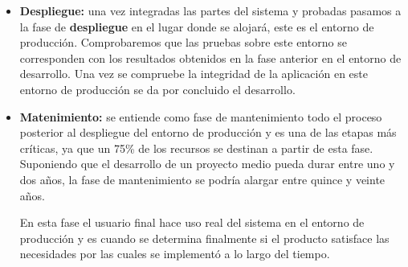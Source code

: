 \begin{itemize}
\item \textbf{Despliegue: } una vez integradas las partes del sistema y probadas pasamos a la fase de \textbf{despliegue} en el lugar donde se alojará, este es el entorno de producción. Comprobaremos que las pruebas sobre este entorno se corresponden con los resultados obtenidos en la fase anterior en el entorno de desarrollo. Una vez se compruebe la integridad de la aplicación en este entorno de producción se da por concluido el desarrollo.
\item \textbf{Matenimiento: } se entiende como fase de mantenimiento todo el proceso posterior al despliegue del entorno de producción y es una de las etapas más críticas, ya que un 75\% de los recursos se destinan a partir de esta fase. Suponiendo que el desarrollo de un proyecto medio pueda durar entre uno y dos años, la fase de mantenimiento se podría alargar entre quince y veinte años. 

\bigskip
En esta fase el usuario final hace uso real del sistema en el entorno de producción y es cuando se determina finalmente si el producto satisface las necesidades por las cuales se implementó a lo largo del tiempo.
\end{itemize}

